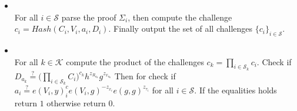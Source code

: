\begin{algorithm}[]
\begin{itemize}
\item {}\\
For all $i\in\mathcal{S}$ parse the proof $\Sigma_i$, then compute the challenge $c_i = Hash(C_i,V_i,a_i,D_i)$. Finally output the set of all challenges $\{c_i\}_{i\in\mathcal{S}}$. 

\item{} \\
For all $k\in\mathcal{K}$ compute the product of the challenges $c_k=\prod_{i\in\mathcal{S}_k} c_i$. Check if $D_{a_k}\overset{?}{=} \big( \prod_{i\in\mathcal{S}_k}C_i\big)^{c_k}h^{z_R_{a_k}}g^{z_x_{a_k}}$ 
Then for check if $ a_i \overset{?}{=} e(V_i,y)^c_i e(V_i,g)^{-z_{x_i}}e(g,g)^{z_{\tau_i}}$ for all $i\in\mathcal{S}$. If the equalities holds return $1$ otherwise return $0$.
\end{itemize}
\label{alg:ZKSM-Agg-Many}
\end{algorithm} 
